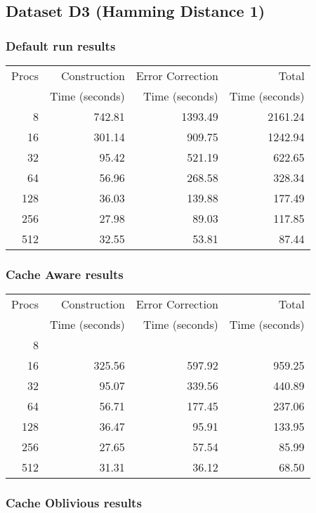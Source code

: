 \documentclass[integrals, nointegrals, article, 12pt, a4paper]{article}
\begin{document}
\subsection{Dataset D3 (Hamming Distance 1)}
\label{sec-2-3}
\subsubsection{Default run results}
\label{sec-2-3-1}

\begin{center}
\begin{tabular}{rrrr}
\hline
Procs & Construction & Error Correction & Total\\
 & Time (seconds) & Time (seconds) & Time (seconds)\\
\hline
8 & 742.81 & 1393.49 & 2161.24\\
16 & 301.14 & 909.75 & 1242.94\\
32 & 95.42 & 521.19 & 622.65\\
64 & 56.96 & 268.58 & 328.34\\
128 & 36.03 & 139.88 & 177.49\\
256 & 27.98 & 89.03 & 117.85\\
512 & 32.55 & 53.81 & 87.44\\
\hline
\end{tabular}
\end{center}
\subsubsection{Cache Aware results}
\label{sec-2-3-2}

\begin{center}
\begin{tabular}{rrrr}
\hline
Procs & Construction & Error Correction & Total\\
 & Time (seconds) & Time (seconds) & Time (seconds)\\
\hline
8 &  &  & \\
16 & 325.56 & 597.92 & 959.25\\
32 & 95.07 & 339.56 & 440.89\\
64 & 56.71 & 177.45 & 237.06\\
128 & 36.47 & 95.91 & 133.95\\
256 & 27.65 & 57.54 & 85.99\\
512 & 31.31 & 36.12 & 68.50\\
\hline
\end{tabular}
\end{center}
\subsubsection{Cache Oblivious results}
\label{sec-2-3-3}
\end{document}
